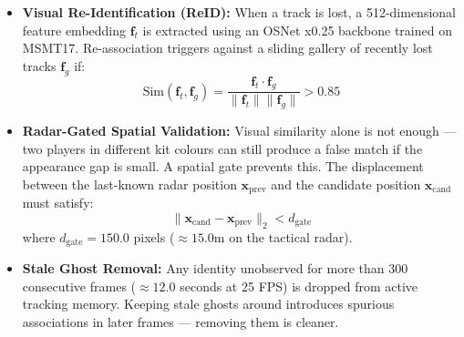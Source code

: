 \documentclass[conference]{IEEEtran}
\begin{document}
\begin{itemize}
    \item \textbf{Visual Re-Identification (ReID):} When a track is lost, a 512-dimensional feature embedding $\mathbf{f}_t$ is extracted using an OSNet x0.25 backbone trained on MSMT17. Re-association triggers against a sliding gallery of recently lost tracks $\mathbf{f}_g$ if:
    \begin{equation}
        \text{Sim}(\mathbf{f}_t, \mathbf{f}_g) =
        \frac{\mathbf{f}_t \cdot \mathbf{f}_g}{\|\mathbf{f}_t\| \|\mathbf{f}_g\|}
        > 0.85
    \end{equation}

    \item \textbf{Radar-Gated Spatial Validation:} Visual similarity alone is not enough --- two players in different kit colours can still produce a false match if the appearance gap is small. A spatial gate prevents this. The displacement between the last-known radar position $\mathbf{x}_{\text{prev}}$ and the candidate position $\mathbf{x}_{\text{cand}}$ must satisfy:
    \begin{equation}
        \|\mathbf{x}_{\text{cand}} - \mathbf{x}_{\text{prev}}\|_2 < d_{\text{gate}}
    \end{equation}
    where $d_{\text{gate}} = 150.0$ pixels ($\approx 15.0\text{m}$ on the tactical radar).

    \item \textbf{Stale Ghost Removal:} Any identity unobserved for more than 300 consecutive frames ($\approx 12.0$ seconds at 25 FPS) is dropped from active tracking memory. Keeping stale ghosts around introduces spurious associations in later frames --- removing them is cleaner.
\end{itemize}
\end{document}
